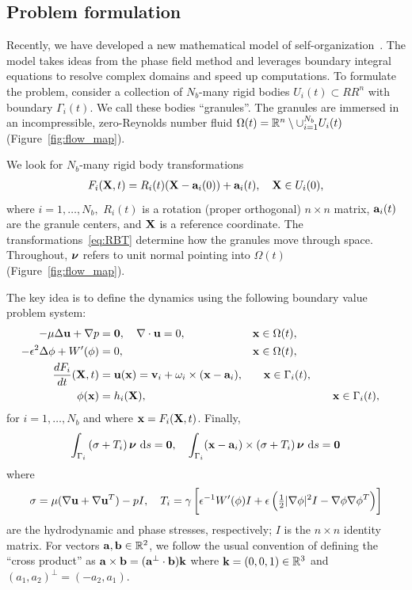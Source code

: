 \subsection{Problem formulation}
Recently, we have developed a new mathematical model of
self-organization~\cite{FuQuRyYo22,fu-ryh-qua-you2022,Fu2018_SIAM}. The
model takes ideas from the phase field method and leverages boundary
integral equations to resolve complex domains and speed up computations.
To formulate the problem, consider a collection of $N_b$-many rigid
bodies $U_i(t) \subset RR^n$ with boundary $\Gamma_i(t)$. We call these
bodies ``granules''. The granules are immersed in an incompressible,
zero-Reynolds number fluid $\Omega(t) = \RR^n \setminus \cup_{i=1}^{N_b}
U_i(t)$ (Figure~\ref{fig:flow_map}).

We look for $N_b$-many rigid body transformations
\begin{align}
\label{eq:RBT}
F_i(\XX,t) = R_i(t)(\XX - \aa_i(0)) + \aa_i(t),\quad \XX \in U_i(0),
\end{align}
where $i = 1,\ldots,N_b,$ $R_i(t)$ is a rotation (proper orthogonal) $n
\times n$ matrix, $\aa_i(t)$ are the granule centers, and $\XX$ is a
reference coordinate. The transformations~\eqref{eq:RBT} determine how
the granules move through space. Throughout, $\nnu$ refers to unit
normal pointing into $\Omega(t)$ (Figure~\ref{fig:flow_map}).

The key idea is to define the dynamics using the following boundary
value problem system:
\begin{alignat}{4}
  \label{eqn:stokes} 
  -\mu\Delta \uu + \nabla p &= \mathbf{0}, 
  \quad \nabla \cdot \uu = 0, &&\xx \in \Omega(t), \\
  \label{eqn:phase}
  -\epsilon^2 \Delta \phi + W'(\phi) &= 0, && \xx \in \Omega(t),\\
  \label{eqn:noslip}        
  \frac{dF_i}{dt}(\XX,t) & = \uu(\xx) = 
    \vv_i + \omega_i \times (\xx - \aa_i), 
  &&\quad \xx \in \Gamma_i(t),\\
  \label{eqn:material}
  \phi(\xx) &= h_i(\XX), &&  &&\quad \xx \in \Gamma_i(t),
\end{alignat}
for $i=1,\ldots,N_b$ and where $\xx = F_i(\XX,t)$.  Finally,
\begin{align}
\label{eqn:stressbalance}
\int_{\Gamma_i} \left(\sigma  + T_i\right)\nnu \,\dif s = \mathbf{0},\quad
\int_{\Gamma_i} (\xx - \aa_i)\times \left(\sigma + T_i\right) \nnu \,\dif s = \mathbf{0}
\end{align}
where
\begin{align}
\label{eqn:hydro_stress}
\sigma = \mu(\nabla \uu + \nabla \uu^T) - pI,\quad 
T_i = \gamma\left[\epsilon^{-1} W'(\phi)I
  + \epsilon\left(\tfrac{1}{2}|\nabla \phi|^2I - \nabla \phi \nabla
  \phi^T\right)\right]
\end{align}
are the hydrodynamic and phase stresses, respectively; $I$ is the
$n\times n$ identity matrix. For vectors $\aa, \bb \in \mathbb{R}^2$,
we follow the usual convention of defining the ``cross product'' as $\aa
\times \bb = (\aa^{\perp} \cdot \bb) \kk$ where $\kk = (0,0,1) \in
\RR^3$ and $(a_1,a_2)^{\perp} = (-a_2,a_1)$.

